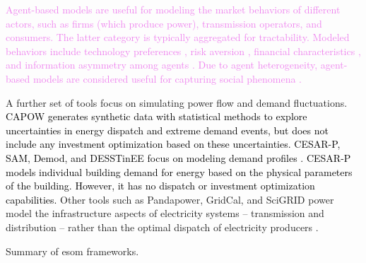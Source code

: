 \textcolor{violet}{Agent-based models are useful for modeling the market
behaviors of different actors, such as firms (which produce power), transmission
operators, and consumers. The latter category is typically aggregated for
tractability. Modeled behaviors include technology preferences
\cite{anwar_modeling_2022, zade_quantifying_2020}, risk aversion
\cite{anwar_modeling_2022}, financial characteristics \cite{anwar_modeling_2022,
nitsch_economic_2021}, and information asymmetry among agents
\cite{anwar_modeling_2022, nitsch_economic_2021}. Due to agent heterogeneity,
agent-based models are considered useful for capturing social phenomena
\cite{yue_review_2018,fattahi_systemic_2020}.}

A further set of tools focus on simulating power flow and demand fluctuations.
\textcolor{black}{CAPOW \cite{su_open_2020} generates synthetic data with
statistical methods to explore uncertainties in energy dispatch and extreme
demand events, but does not include any investment optimization based on these
uncertainties.} \textcolor{black}{CESAR-P, SAM, Demod, and DESSTinEE focus on
modeling demand profiles
\cite{leoniefierz_hues-platformcesar-p-core_2021,bosmann_shape_2015,barsanti_socio-technical_2021}.
CESAR-P models individual building demand for energy based on the physical
parameters of the building. However, it has no dispatch or investment
optimization capabilities.} Other tools such as Pandapower, GridCal, and SciGRID
power model the infrastructure aspects of electricity systems -- transmission
and distribution -- rather than the optimal dispatch of electricity producers
\cite{thurner_pandapower_2018, vera_gridcal_2022, matke_structure_2017}.

\begin{table}
    \centering
    \caption{Summary of \ac{esom} frameworks.}
    \label{tab:esoms}
    \resizebox*{\textwidth}{0.95\textheight}{}
\end{table}


